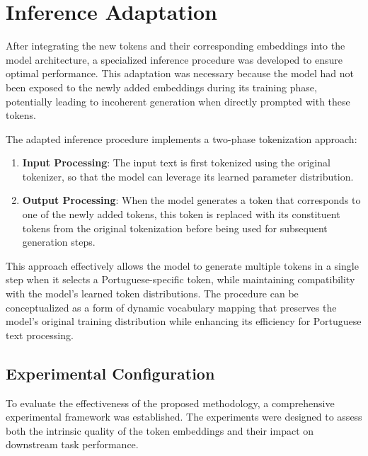 
\chapter{Inference Adaptation}


\label{chap:inference_adaptation}

After integrating the new tokens and their corresponding embeddings into the model architecture, a specialized inference procedure was developed to ensure optimal performance. This adaptation was necessary because the model had not been exposed to the newly added embeddings during its training phase, potentially leading to incoherent generation when directly prompted with these tokens.

The adapted inference procedure implements a two-phase tokenization approach:

\begin{enumerate}
    \item \textbf{Input Processing}: The input text is first tokenized using the original tokenizer, so that the model can leverage its learned parameter distribution.
    
    \item \textbf{Output Processing}: When the model generates a token that corresponds to one of the newly added tokens, this token is replaced with its constituent tokens from the original tokenization before being used for subsequent generation steps.
\end{enumerate}

This approach effectively allows the model to generate multiple tokens in a single step when it selects a Portuguese-specific token, while maintaining compatibility with the model's learned token distributions. The procedure can be conceptualized as a form of dynamic vocabulary mapping that preserves the model's original training distribution while enhancing its efficiency for Portuguese text processing.

\section{Experimental Configuration}
To evaluate the effectiveness of the proposed methodology, a comprehensive experimental framework was established. The experiments were designed to assess both the intrinsic quality of the token embeddings and their impact on downstream task performance.

